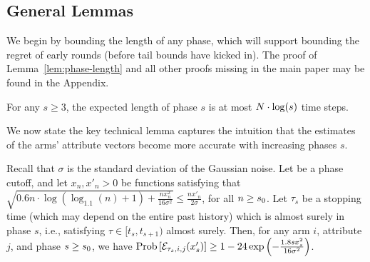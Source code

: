 \subsection{General Lemmas}





We begin by bounding the length of any phase, which will support bounding
the regret of early rounds
(before tail bounds have kicked in). The proof of Lemma~\ref{lem:phase-length} and all other proofs missing in the main paper may be found in the Appendix.


\begin{lemma} \label{lem:phase-length}
For any $s\geq 3$, the expected length of phase $s$ is at most
$N \cdot \log(s)$ time steps.
\end{lemma}
                  
We now state the key technical lemma captures the intuition that
the estimates of the arms' attribute vectors become
more accurate with increasing phases $s$.

\begin{lemma} \label{lem:round-prob}
Recall that $\sigma$ is the standard deviation of the Gaussian noise.
Let \LatePhase be a phase cutoff, 
and let $x_n, x'_n > 0$ be functions satisfying that
$\sqrt{0.6 n \cdot \log (\log_{1.1}(n) + 1) + \frac{n x_n^2}{16 \sigma^2}}
\leq \frac{n x'_n}{2 \sigma}$,
for all $n \geq s_0$.
Let $\tau_s$ be a stopping time
(which may depend on the entire past history)
which is almost surely in phase $s$,
i.e., satisfying $\tau \in [t_s, t_{s+1})$ almost surely.
Then, for any arm $i$, attribute $j$, and phase $s \geq s_0$,
we have 
$\Prob{\AccE{\tau_s}{i}{j}{x'_s}}
\geq 1 - 24 \exp\left(-\frac{1.8 s x_s^2}{16 \sigma^2} \right)$.
\end{lemma}

